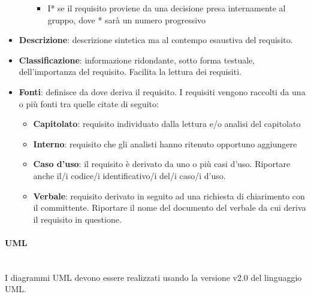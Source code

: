 \begin{itemize}
\begin{itemize}
\begin{itemize}
			\item I* se il requisito proviene da una decisione presa internamente al gruppo, dove * sarà un numero progressivo
		\end{itemize}
\end{itemize}
	\item \textbf{Descrizione}: descrizione sintetica ma al contempo esaustiva del requisito.
	\item \textbf{Classificazione}: informazione ridondante, sotto forma testuale, dell’importanza del requisito. Facilita la lettura dei requisiti.
	\item \textbf{Fonti}: definisce da dove deriva il requisito. I requisiti vengono raccolti da una o più fonti tra quelle citate di seguito:
	\begin{itemize}
		\item \textbf{Capitolato}: requisito individuato dalla lettura e/o analisi del capitolato
		\item \textbf{Interno}: requisito che gli analisti hanno ritenuto opportuno aggiungere
		\item \textbf{Caso d’uso}: il requisito è derivato da uno o più casi d’uso. Riportare anche il/i codice/i identificativo/i del/i caso/i d’uso.
		\item \textbf{Verbale}: requisito derivato in seguito ad una richiesta di chiarimento con il committente. Riportare il nome del documento del verbale da cui deriva il requisito in questione.		
	\end{itemize}
\end{itemize}
\paragraph{UML}\mbox{}\\
I diagrammi UML devono essere realizzati usando la versione v2.0 del linguaggio UML.



